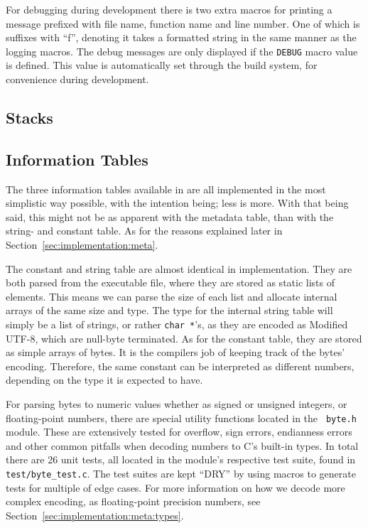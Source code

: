 For debugging during development there is two extra macros for printing a
message prefixed with file name, function name and line number. One of which is
suffixes with ``f'', denoting it takes a formatted string in the same manner as
the logging macros. The debug messages are only displayed if the {\tt DEBUG} macro value is
defined. This value is automatically set through the build system, for
convenience during development.

\subsection{Stacks}
\label{sec:implementation:stacks}


\subsection{Information Tables}
\label{sec:implementation:infotables}

The three information tables available in \thename{} are all implemented in the
most simplistic way possible, with the intention being; less is more. With that
being said, this might not be as apparent with the metadata table, than with the
string- and constant table. As for the reasons explained later in
Section~\ref{sec:implementation:meta}.

The constant and string table are almost identical in implementation. They are
both parsed from the executable file, where they are stored as static lists of
elements. This means we can parse the size of each list and allocate internal
arrays of the same size and type. The type for the internal string table will
simply be a list of strings, or rather {\tt char *}'s, as they are encoded as
Modified UTF-8, which are null-byte terminated. As for the constant table, they
are stored as simple arrays of bytes. It is the compilers job of keeping track
of the bytes' encoding. Therefore, the same constant can be interpreted as
different numbers, depending on the type it is expected to have.

For parsing bytes to numeric values whether as signed or unsigned integers, or
floating-point numbers, there are special utility functions located in the {\tt
  byte.h} module. These are extensively tested for overflow, sign errors,
endianness errors and other common pitfalls when decoding numbers to C's
built-in types. In total there are 26 unit tests, all located in the module's
respective test suite, found in {\tt test/byte\_test.c}. The test suites are
kept ``DRY'' by using macros to generate tests for multiple of edge cases. For
more information on how we decode more complex encoding, as floating-point
precision numbers, see Section~\ref{sec:implementation:meta:types}.

